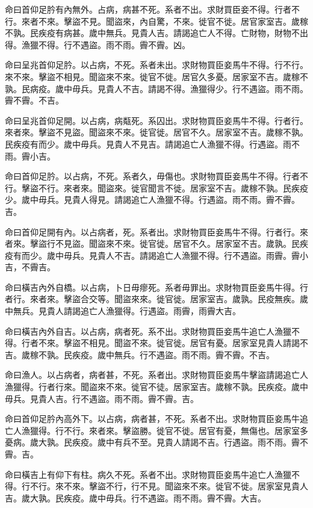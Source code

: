 \begin{pinyinscope}
命曰首仰足肣有內無外。占病，病甚不死。系者不出。求財買臣妾不得。行者不行。來者不來。擊盜不見。聞盜來，內自驚，不來。徙官不徙。居官家室吉。歲稼不孰。民疾疫有病甚。歲中無兵。見貴人吉。請謁追亡人不得。亡財物，財物不出得。漁獵不得。行不遇盜。雨不雨。霽不霽。凶。

命曰呈兆首仰足肣。以占病，不死。系者未出。求財物買臣妾馬牛不得。行不行。來不來。擊盜不相見。聞盜來不來。徙官不徙。居官久多憂。居家室不吉。歲稼不孰。民病疫。歲中毋兵。見貴人不吉。請謁不得。漁獵得少。行不遇盜。雨不雨。霽不霽。不吉。

命曰呈兆首仰足開。以占病，病甐死。系囚出。求財物買臣妾馬牛不得。行者行。來者來。擊盜不見盜。聞盜來不來。徙官徙。居官不久。居家室不吉。歲稼不孰。民疾疫有而少。歲中毋兵。見貴人不見吉。請謁追亡人漁獵不得。行遇盜。雨不雨。霽小吉。

命曰首仰足肣。以占病，不死。系者久，毋傷也。求財物買臣妾馬牛不得。行者不行。擊盜不行。來者來。聞盜來。徙官聞言不徙。居家室不吉。歲稼不孰。民疾疫少。歲中毋兵。見貴人得見。請謁追亡人漁獵不得。行遇盜。雨不雨。霽不霽。吉。

命曰首仰足開有內。以占病者，死。系者出。求財物買臣妾馬牛不得。行者行。來者來。擊盜行不見盜。聞盜來不來。徙官徙。居官不久。居家室不吉。歲孰。民疾疫有而少。歲中毋兵。見貴人不吉。請謁追亡人漁獵不得。行不遇盜。雨霽。霽小吉，不霽吉。

命曰橫吉內外自橋。以占病，卜日毋瘳死。系者毋罪出。求財物買臣妾馬牛得。行者行。來者來。擊盜合交等。聞盜來來。徙官徙。居家室吉。歲孰。民疫無疾。歲中無兵。見貴人請謁追亡人漁獵得。行遇盜。雨霽，雨霽大吉。

命曰橫吉內外自吉。以占病，病者死。系不出。求財物買臣妾馬牛追亡人漁獵不得。行者不來。擊盜不相見。聞盜不來。徙官徙。居官有憂。居家室見貴人請謁不吉。歲稼不孰。民疾疫。歲中無兵。行不遇盜。雨不雨。霽不霽。不吉。

命曰漁人。以占病者，病者甚，不死。系者出。求財物買臣妾馬牛擊盜請謁追亡人漁獵得。行者行來。聞盜來不來。徙官不徒。居家室吉。歲稼不孰。民疾疫。歲中毋兵。見貴人吉。行不遇盜。雨不雨。霽不霽。吉。

命曰首仰足肣內高外下。以占病，病者甚，不死。系者不出。求財物買臣妾馬牛追亡人漁獵得。行不行。來者來。擊盜勝。徙官不徙。居官有憂，無傷也。居家室多憂病。歲大孰。民疾疫。歲中有兵不至。見貴人請謁不吉。行遇盜。雨不雨。霽不霽。吉。

命曰橫吉上有仰下有柱。病久不死。系者不出。求財物買臣妾馬牛追亡人漁獵不得。行不行。來不來。擊盜不行，行不見。聞盜來不來。徙官不徙。居家室見貴人吉。歲大孰。民疾疫。歲中毋兵。行不遇盜。雨不雨。霽不霽。大吉。


\end{pinyinscope}
